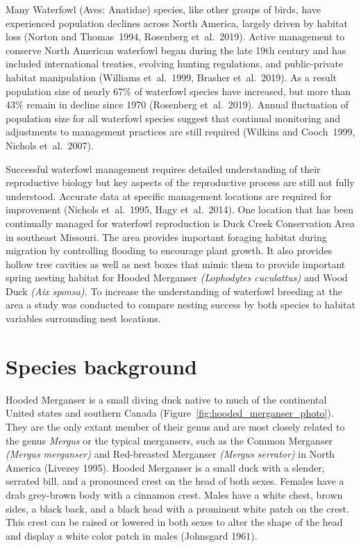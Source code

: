 
Many Waterfowl (Aves: Anatidae) species, like other groups of birds, have experienced population declines across North America, largely driven by habitat loss (Norton and Thomas~1994, Rosenberg et~al.~2019).  Active management to conserve North American waterfowl began during the late 19th century and has included international treaties, evolving hunting regulations, and public-private habitat manipulation (Williams et~al.~1999, Brasher et~al.~2019). As a result population size of nearly 67\% of waterfowl species have increased, but more than 43\% remain in decline since 1970 (Rosenberg et~al.~2019). Annual fluctuation of population size for all waterfowl species suggest that continual monitoring and adjustments to management practices are still required  (Wilkins and Cooch~1999, Nichols et~al.~2007). 

Successful waterfowl management requires detailed understanding of their reproductive biology but key aspects of the reproductive process are still not fully understood. Accurate data at specific management locations are required for improvement (Nichols et~al.~1995, Hagy et~al.~2014). One location that has been continually managed for waterfowl reproduction is Duck Creek Conservation Area in southeast Missouri. The area provides important foraging habitat during migration by controlling flooding to encourage plant growth. It also provides hollow tree cavities as well as nest boxes that mimic them to provide important spring nesting habitat for Hooded Merganser \textit{(Lophodytes cuculattus)} and Wood Duck \textit{(Aix sponsa).} To increase the understanding of waterfowl breeding at the area a study was conducted to compare nesting success by both species to habitat variables surrounding nest locations.  



\section*{Species background}

Hooded Merganser is a small diving duck native to much of the continental United states and southern Canada (Figure~\ref{fig:hooded_merganser_photo}). They are the only extant member of their genus and are most closely related to the genus \textit{Mergus} or the typical mergansers, such as the Common Merganser \textit{(Mergus merganser)} and Red-breasted Merganser \textit{(Mergus serrator)} in North America (Livezey 1995). Hooded Merganser is a small duck with a slender, serrated bill, and a pronounced crest on the head of both sexes. Females have a drab grey-brown body with a cinnamon crest. Males have a white chest, brown sides, a black back, and a black head with a prominent white patch on the crest. This crest can be raised or lowered in both sexes to alter the shape of the head and display a white color patch in males (Johnsgard 1961). 

